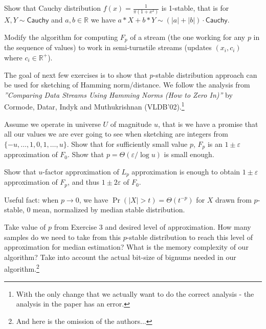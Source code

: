 \documentclass[12pt]{uebung}
\begin{document}
 


\renewcommand{\aufgname}{Exercise}
\begin{aufg}
Show that Cauchy distribution $f(x) = \frac{1}{\pi(1+x^2)}$ is 1-stable, that is for $X,Y \sim \textsf{Cauchy}$ and $a,b \in \mathbb{R}$ we have $a*X+b*Y \sim (|a|+|b|) \cdot \textsf{Cauchy}$.
\end{aufg}

\begin{aufg}
Modify the algorithm for computing $F_p$ of a stream (the one working for any $p$ in the sequence of values) to work in semi-turnstile streams (updates $(x_i,c_i)$ where $c_i \in \mathbb{R}^+$).
\end{aufg}

\bigskip
\bigskip

The goal of next few exercises is to show that $p$-stable distribution approach can be used for sketching of Hamming norm/distance. We follow the analysis from \emph{''Comparing Data Streams Using Hamming Norms
(How to Zero In)''} by Cormode, Datar, Indyk and Muthukrishnan (VLDB'02).\footnote{With the only change that we actually want to do the correct analysis - the analysis in the paper has an error.}

\begin{aufg}
Assume we operate in universe $U$ of magnitude $u$, that is we have a promise that all our values we are ever going to see when sketching are integers from $\{-u,\ldots,1,0,1,\ldots,u\}$. Show that for sufficiently small value $p$, $F_p$ is an $1 \pm \varepsilon$ approximation of $F_0$. Show that $p= \Theta(\varepsilon/\log u)$ is small enough.

Show that $u$-factor approximation of $L_p$ approximation is enough to obtain $1 \pm \varepsilon$ approximation of $F_p$, and thus $1 \pm 2\varepsilon$ of $F_0$.
\end{aufg}

\bigskip
\bigskip


Useful fact: when $p \to 0$, we have $\Pr( |X| > t) = \Theta(t^{-p})$ for $X$ drawn from $p$-stable, 0 mean, normalized by median stable distribution.

\begin{aufg}[2 pts]
Take value of $p$ from Exercise 3 and desired level of approximation. How many samples do we need to take from this $p$-stable distribution to reach this level of approximation for median estimation?
What is the memory complexity of our algorithm? Take into account the actual bit-size of bignums needed in our algorithm.\footnote{And here is the omission of the authors...}
\end{aufg}
\end{document}
